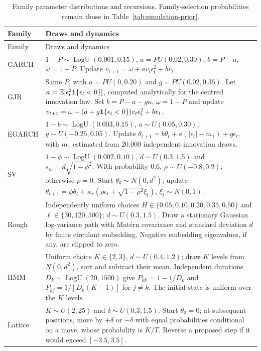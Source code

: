 \begin{longtable}{@{}>{\raggedright\arraybackslash}p{2.0cm}>{\raggedright\arraybackslash}p{11.8cm}@{}}
\caption[Broad-prior parameter draws]{Family parameter distributions and recursions. Family-selection probabilities remain those in Table~\ref{tab:simulation-prior}.}\label{tab:prior-parameter-draws}\\
\toprule Family & Draws and dynamics \\
\midrule
\endfirsthead
\toprule Family & Draws and dynamics \\
\midrule
\endhead
GARCH & $1-P\sim\operatorname{LogU}(0.001,0.15)$, $a=P U(0.02,0.30)$, $b=P-a$, $\omega=1-P$. Update $v_{t+1}=\omega+a v_t\epsilon_t^2+bv_t$. \\
GJR & Same $P$, with $a=P U(0,0.20)$ and $g=P U(0.02,0.35)$. Let $\kappa=\mathbb{E}[\epsilon_t^2\mathbf{1}\{\epsilon_t<0\}]$, computed analytically for the centred innovation law. Set $b=P-a-g\kappa$, $\omega=1-P$ and update $v_{t+1}=\omega+(a+g\mathbf{1}\{\epsilon_t<0\})v_t\epsilon_t^2+bv_t$. \\
EGARCH & $1-b\sim\operatorname{LogU}(0.003,0.15)$, $a\sim U(0.05,0.30)$, $g\sim U(-0.25,0.05)$. Update $\theta_{t+1}=b\theta_t+a(|\epsilon_t|-m_1)+g\epsilon_t$, with $m_1$ estimated from 20,000 independent innovation draws. \\
SV & $1-\phi\sim\operatorname{LogU}(0.002,0.10)$, $d\sim U(0.3,1.5)$ and $s_w=d\sqrt{1-\phi^2}$. With probability 0.6, $\rho\sim U(-0.8,0.2)$; otherwise $\rho=0$. Start $\theta_0\sim N(0,d^2)$; update $\theta_{t+1}=\phi\theta_t+s_w(\rho\epsilon_t+\sqrt{1-\rho^2}\xi_t)$, $\xi_t\sim N(0,1)$. \\
Rough & Independently uniform choices $H\in\{0.05,0.10,0.20,0.35,0.50\}$ and $\ell\in\{30,120,500\}$; $d\sim U(0.3,1.5)$. Draw a stationary Gaussian log-variance path with Mat\'ern covariance and standard deviation $d$ by finite circulant embedding. Negative embedding eigenvalues, if any, are clipped to zero. \\
HMM & Uniform choice $K\in\{2,3\}$, $d\sim U(0.4,1.2)$; draw $K$ levels from $N(0,d^2)$, sort and subtract their mean. Independent durations $D_k\sim\operatorname{LogU}(20,1500)$ give $P_{kk}=1-1/D_k$ and $P_{kj}=1/[D_k(K-1)]$ for $j\ne k$. The initial state is uniform over the $K$ levels. \\
Lattice & $K\sim U(2,25)$ and $\delta\sim U(0.3,1.5)$. Start $\theta_0=0$; at subsequent positions, move by $+\delta$ or $-\delta$ with equal probabilities conditional on a move, whose probability is $K/T$. Reverse a proposed step if it would exceed $[-3.5,3.5]$. \\
\bottomrule
\end{longtable}

